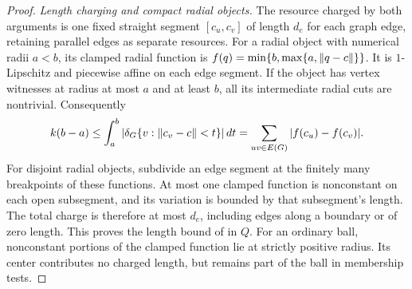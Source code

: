 \begin{proof}
\emph{Length charging and compact radial objects.}
The resource charged by both arguments is one fixed straight
segment $[c_u,c_v]$ of length $d_e$ for each graph edge, retaining
parallel edges as separate resources.  For a radial object with numerical radii
$a<b$, its clamped radial function is
$f(q)=\min\{b,\max\{a,\lVert q-c\rVert\}\}$.
It is $1$-Lipschitz and piecewise affine on each edge segment.
If the object has vertex witnesses at radius at most $a$ and at
least $b$, all its intermediate radial cuts are nontrivial.
Consequently
\[
 k(b-a)\le\int_a^b|\delta_G\{v:\lVert c_v-c\rVert<t\}|\,dt
 =\sum_{uv\in E(G)}|f(c_u)-f(c_v)|.
\]
For disjoint radial objects, subdivide an edge segment at the finitely many
breakpoints of these functions.  At most one clamped function is
nonconstant on each open subsegment, and its variation is bounded
by that subsegment's length.  The total charge is therefore at most
$d_e$, including edges along a boundary or of zero length.  This
proves the length bound of \cite[Lemma B.9]{ThinTreesCompanion} in $Q$.
For an ordinary ball, nonconstant portions of the clamped function
lie at strictly positive radius.  Its center contributes no charged
length, but remains part of the ball in membership tests.


\end{proof}
